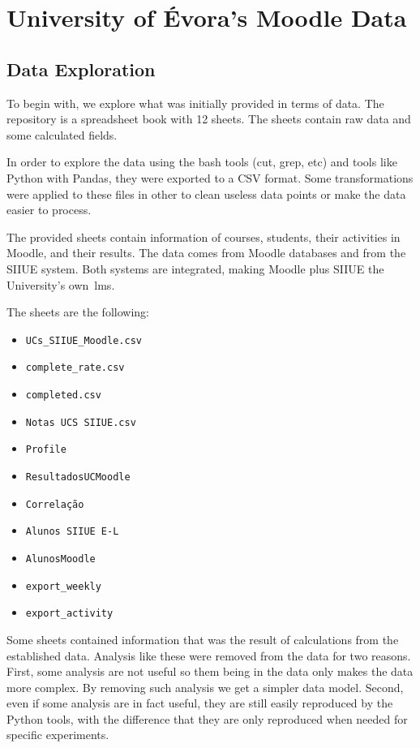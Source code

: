 \chapter{University of Évora's Moodle Data}
\label{sec:data}

\section{Data Exploration}

To begin with, we explore what was initially provided in terms of data. The
repository is a spreadsheet book with 12 sheets. The sheets contain raw data
and some calculated fields.

In order to explore the data using the bash tools (cut, grep, etc) and tools
like Python with Pandas, they were exported to a CSV format. Some
transformations were applied to these files in other to clean useless data
points or make the data easier to process.

The provided sheets contain information of courses, students, their activities
in Moodle, and their results. The data comes from Moodle databases and from the
SIIUE system. Both systems are integrated, making Moodle plus SIIUE the
University's own~\gls{lms}.

The sheets are the following:

\begin{itemize}
    \item \texttt{UCs\_SIIUE\_Moodle.csv}
    \item \texttt{complete\_rate.csv}
    \item \texttt{completed.csv}
    \item \texttt{Notas UCS SIIUE.csv}
    \item \texttt{Profile}
    \item \texttt{ResultadosUCMoodle}
    \item \texttt{Correlação}
    \item \texttt{Alunos SIIUE E-L}
    \item \texttt{AlunosMoodle}
    \item \texttt{export\_weekly}
    \item \texttt{export\_activity}
\end{itemize}

Some sheets contained information that was the result of calculations from the
established data. Analysis like these were removed from the data for two
reasons. First, some analysis are not useful so them being in the data only
makes the data more complex. By removing such analysis we get a simpler data
model. Second, even if some analysis are in fact useful, they are still easily
reproduced by the Python tools, with the difference that they are only
reproduced when needed for specific experiments.

